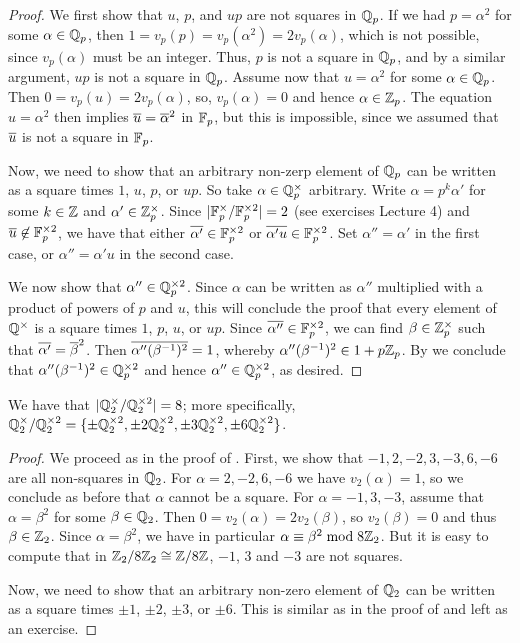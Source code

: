 \documentclass[12pt, leqno, british]{amsart}
\begin{document}
\begin{proof}
We first show that $u$, $p$, and $up$ are not squares in $\mathbb Q_p$.
If we had $p = \alpha^2$ for some $\alpha \in \mathbb Q_p$, then $1 = v_p(p) = v_p(\alpha^2) = 2v_p(\alpha)$, which is not possible, since $v_p(\alpha)$ must be an integer.
Thus, $p$ is not a square in $\mathbb Q_p$, and by a similar argument, $up$ is not a square in $\mathbb Q_p$.
Assume now that $u = \alpha^2$ for some $\alpha \in \mathbb Q_p$.
Then $0 = v_p(u) = 2v_p(\alpha)$, so, $v_p(\alpha) = 0$ and hence $\alpha \in \mathbb Z_p$.
The equation $u = \alpha^2$ then implies $\overline{u} = \overline{\alpha}^2$ in $\mathbb F_p$, but this is impossible, since we assumed that $\overline{u}$ is not a square in $\mathbb F_p$.

Now, we need to show that an arbitrary non-zerp element of $\mathbb Q_p$ can be written as a square times $1$, $u$, $p$, or $up$.
So take $\alpha \in \mathbb Q_p^\times$ arbitrary.
Write $\alpha = p^k \alpha'$ for some $k \in \mathbb Z$ and $\alpha' \in \mathbb Z_p^\times$.
Since $\lvert \mathbb F_p^\times / \mathbb F_p^{\times 2} \rvert = 2$ (see exercises Lecture 4) and $\overline{u} \not\in \mathbb F_p^{\times 2}$, we have that either $\overline{\alpha'} \in \mathbb F_p^{\times 2}$ or $\overline{\alpha'u} \in \mathbb F_p^{\times 2}$.
Set $\alpha'' = \alpha'$ in the first case, or $\alpha'' = \alpha'u$ in the second case.

We now show that $\alpha'' \in \mathbb Q_p^{\times 2}$.
Since $\alpha$ can be written as $\alpha''$ multiplied with a product of powers of $p$ and $u$, this will conclude the proof that every element of $\mathbb Q^\times$ is a square times $1$, $p$, $u$, or $up$.
Since $\overline{\alpha''} \in \mathbb F_p^{\times 2}$, we can find $\beta \in \mathbb Z_p^\times$ such that $\overline{\alpha'} = \overline{\beta}^2$.
Then $\overline{\alpha''(\beta^{-1})^2} = 1$, whereby $\alpha''(\beta^{-1})^2 \in 1 + p\mathbb Z_p$.
By  we conclude that $\alpha''(\beta^{-1})^2 \in \mathbb Q_p^{\times 2}$ and hence $\alpha'' \in \mathbb Q_p^{\times 2}$, as desired.
\end{proof}
\begin{cor}\label{C:qq2-squares}
We have that $\lvert \mathbb Q_2^\times/\mathbb Q_2^{\times 2} \rvert = 8$; more specifically, $\mathbb Q_2^\times/\mathbb Q_2^{\times 2} = \lbrace \pm\mathbb Q_2^{\times 2}, \pm 2\mathbb Q_2^{\times 2}, \pm 3\mathbb Q_2^{\times 2}, \pm 6 \mathbb Q_2^{\times 2} \rbrace$.
\end{cor}
\begin{proof}
We proceed as in the proof of .
First, we show that $-1, 2, -2, 3, -3, 6, -6$ are all non-squares in $\mathbb Q_2$.
For $\alpha = 2, -2, 6, -6$ we have $v_2(\alpha)=1$, so we conclude as before that $\alpha$ cannot be a square.
For $\alpha = -1, 3, -3$, assume that $\alpha = \beta^2$ for some $\beta \in \mathbb Q_2$.
Then $0 = v_2(\alpha) = 2v_2(\beta)$, so $v_2(\beta) = 0$ and thus $\beta \in \mathbb Z_2$.
Since $\alpha = \beta^2$, we have in particular $\alpha \equiv \beta^2 \bmod 8\mathbb Z_2$.
But it is easy to compute that in $\mathbb Z_2/8\mathbb Z_2 \cong \mathbb Z/8\mathbb Z$, $-1$, $3$ and $-3$ are not squares.

Now, we need to show that an arbitrary non-zero element of $\mathbb Q_2$ can be written as a square times $\pm 1$, $\pm 2$, $\pm 3$, or $\pm 6$.
This is similar as in the proof of  and left as an exercise.
\end{proof}
\end{document}
